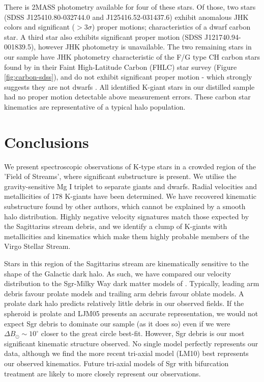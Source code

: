\documentclass[preprint2]{aastex}
\begin{document}
	There is 2MASS photometry available for four of these stars. Of those, two stars (SDSS J125410.80-032744.0 and J125416.52-031437.6) exhibit anomalous JHK colors and significant ($> 3\sigma$) proper motions; characteristics of a dwarf carbon star. A third star also exhibits significant proper motion (SDSS J121740.94-001839.5), however JHK photometry is unavailable. The two remaining stars in our sample have JHK photometry characteristic of the F/G type CH carbon stars found by \citet{Downes;et-al_2004} in their Faint High-Latitude Carbon (FHLC) star survey (Figure \ref{fig:carbon-sdss}), and do not exhibit significant proper motion - which strongly suggests they are not dwarfs \citep{Green;et-al_1994, Deutsch_1994}. All identified K-giant stars in our distilled sample had no proper motion detectable above measurement errors.  These carbon star kinematics are representative of a typical halo population.

	
\section{Conclusions}
\label{sec:conclusions}

	We present spectroscopic observations of K-type stars in a crowded region of the 'Field of Streams', where significant substructure is present. We utilise the gravity-sensitive Mg I triplet to separate giants and dwarfs. Radial velocities and metallicities of 178 K-giants have been determined. We have recovered kinematic substructure found by other authors, which cannot be explained by a smooth halo distribution. Highly negative velocity signatures match those expected by the Sagittarius stream debris, and we identify a clump of K-giants with metallicities and kinematics which make them highly probable members of the Virgo Stellar Stream.

	Stars in this region of the Sagittarius stream are kinematically sensitive to the shape of the Galactic dark halo. As such, we have compared our velocity distribution to the Sgr-Milky Way dark matter models of \citet{Law;et-al_2005, Law;Majewski_2010}. Typically, leading arm debris favour prolate models and trailing arm debris favour oblate models. A prolate dark halo predicts relatively little debris in our observed fields. If the spheroid is prolate and LJM05 presents an accurate representation, we would not expect Sgr debris to dominate our sample (as it does so) even if we were $\Delta{}B_\odot\sim10^\circ$ closer to the great circle best-fit. However, Sgr debris is our most significant kinematic structure observed. No single model perfectly represents our data, although we find the more recent tri-axial model (LM10) best represents our observed kinematics. Future tri-axial models of Sgr with bifurcation treatment are likely to more closely represent our observations.
	
\end{document}
